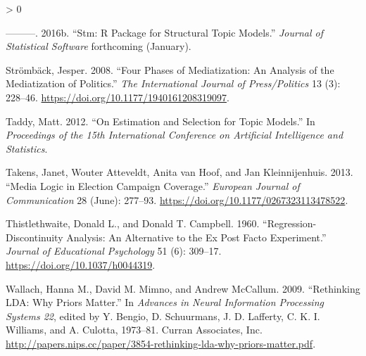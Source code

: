 \documentclass[
]{article}
\newlength{\cslhangindent}
\newenvironment{CSLReferences}[2] %
 {%
  \setlength{\parindent}{0pt}
  \ifodd #1 \everypar{\setlength{\hangindent}{\cslhangindent}}\ignorespaces\fi
  \ifnum #2 > 0
  \setlength{\parskip}{#2\baselineskip}
  \fi
 }%
 {}
\begin{document}
\begin{CSLReferences}{1}{0}
\leavevmode\hypertarget{ref-roberts_stm:_2016}{}%
---------. 2016b. {``Stm: R Package for Structural Topic Models.''}
\emph{Journal of Statistical Software} forthcoming (January).

\leavevmode\hypertarget{ref-stromback_four_2008}{}%
Strömbäck, Jesper. 2008. {``Four Phases of Mediatization: An Analysis of
the Mediatization of Politics.''} \emph{The International Journal of
Press/Politics} 13 (3): 228--46.
\url{https://doi.org/10.1177/1940161208319097}.

\leavevmode\hypertarget{ref-taddy_estimation_2012}{}%
Taddy, Matt. 2012. {``On Estimation and Selection for Topic Models.''}
In \emph{Proceedings of the 15th International Conference on Artificial
Intelligence and Statistics}.

\leavevmode\hypertarget{ref-takens_media_2013}{}%
Takens, Janet, Wouter Atteveldt, Anita van Hoof, and Jan Kleinnijenhuis.
2013. {``Media Logic in Election Campaign Coverage.''} \emph{European
Journal of Communication} 28 (June): 277--93.
\url{https://doi.org/10.1177/0267323113478522}.

\leavevmode\hypertarget{ref-thistlethwaite_regression-discontinuity_1960}{}%
Thistlethwaite, Donald L., and Donald T. Campbell. 1960.
{``Regression-Discontinuity Analysis: An Alternative to the Ex Post
Facto Experiment.''} \emph{Journal of Educational Psychology} 51 (6):
309--17. \url{https://doi.org/10.1037/h0044319}.

\leavevmode\hypertarget{ref-wallach_rethinking_2009}{}%
Wallach, Hanna M., David M. Mimno, and Andrew McCallum. 2009.
{``Rethinking {LDA}: Why Priors Matter.''} In \emph{Advances in Neural
Information Processing Systems 22}, edited by Y. Bengio, D. Schuurmans,
J. D. Lafferty, C. K. I. Williams, and A. Culotta, 1973--81. Curran
Associates, Inc.
\url{http://papers.nips.cc/paper/3854-rethinking-lda-why-priors-matter.pdf}.

\end{CSLReferences}
\end{document}
